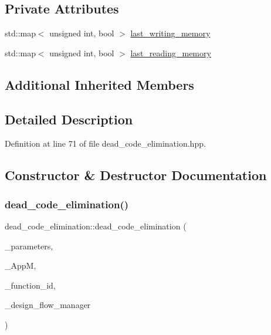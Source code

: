 \subsection*{Private Attributes}
\begin{DoxyCompactItemize}
\item 
std\+::map$<$ unsigned int, bool $>$ \hyperlink{classdead__code__elimination_afc8160e9bee2fd03c06cb05815701f19}{last\+\_\+writing\+\_\+memory}
\item 
std\+::map$<$ unsigned int, bool $>$ \hyperlink{classdead__code__elimination_a8d9207a50c8c7a7872c13e6f7e9387c1}{last\+\_\+reading\+\_\+memory}
\end{DoxyCompactItemize}
\subsection*{Additional Inherited Members}


\subsection{Detailed Description}


Definition at line 71 of file dead\+\_\+code\+\_\+elimination.\+hpp.



\subsection{Constructor \& Destructor Documentation}
\mbox{\label{classdead__code__elimination_a75171b8c1c163c7ded6e51d528d314d6}} 
\subsubsection{\texorpdfstring{dead\+\_\+code\+\_\+elimination()}{dead\_code\_elimination()}}
{\footnotesize\ttfamily dead\+\_\+code\+\_\+elimination\+::dead\+\_\+code\+\_\+elimination (\begin{DoxyParamCaption}\item[{const \hyperlink{Parameter_8hpp_a37841774a6fcb479b597fdf8955eb4ea}{Parameter\+Const\+Ref}}]{\+\_\+parameters,  }\item[{const \hyperlink{application__manager_8hpp_a04ccad4e5ee401e8934306672082c180}{application\+\_\+manager\+Ref}}]{\+\_\+\+AppM,  }\item[{unsigned int}]{\+\_\+function\+\_\+id,  }\item[{const Design\+Flow\+Manager\+Const\+Ref}]{\+\_\+design\+\_\+flow\+\_\+manager }\end{DoxyParamCaption})}



